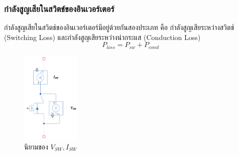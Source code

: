 \documentclass[11pt,a4paper]{article}
\begin{document}
\subsubsection{กำลังสูญเสียในสวิตช์ของอินเวอร์เตอร์}
กำลังสูญเสียในสวิตช์ของอินเวอร์เตอร์มีอยู่ด้วยกันสองประเภท คือ กำลังสูญเสียระหว่างสวิตช์ (Switching Loss) และกำลังสูญเสียระหว่างนำกระแส (Conduction Loss)
\begin{equation}
    P_{loss} = P_{sw} + P_{cond}
\end{equation}

\begin{figure}[h]
    \centering
    \includegraphics[width=0.25\textwidth]{vsw_isw.png}
    \caption{นิยามของ $V_{SW}, I_{SW}$}
    \label{vsw_isw_definition}
\end{figure}
\end{document}

